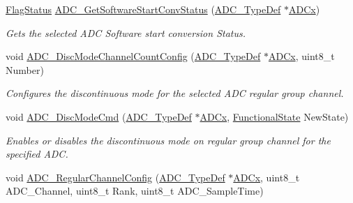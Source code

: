 \begin{DoxyCompactItemize}
\mbox{\hyperlink{group___exported__types_ga89136caac2e14c55151f527ac02daaff}{Flag\+Status}} \mbox{\hyperlink{group___a_d_c___exported___functions_gaf1119583782ecbcec380efcb7eb74883}{A\+D\+C\+\_\+\+Get\+Software\+Start\+Conv\+Status}} (\mbox{\hyperlink{struct_a_d_c___type_def}{A\+D\+C\+\_\+\+Type\+Def}} $\ast$\mbox{\hyperlink{group___s_t_m32_f1_x_x___n_u_c_l_e_o___l_o_w___l_e_v_e_l___exported___constants_gab44c1065d38c298955fc028346984340}{A\+D\+Cx}})
\begin{DoxyCompactList}\small\item\em Gets the selected A\+DC Software start conversion Status. \end{DoxyCompactList}\item 
void \mbox{\hyperlink{group___a_d_c___exported___functions_ga6eb241ba82d67d1371136c9132083937}{A\+D\+C\+\_\+\+Disc\+Mode\+Channel\+Count\+Config}} (\mbox{\hyperlink{struct_a_d_c___type_def}{A\+D\+C\+\_\+\+Type\+Def}} $\ast$\mbox{\hyperlink{group___s_t_m32_f1_x_x___n_u_c_l_e_o___l_o_w___l_e_v_e_l___exported___constants_gab44c1065d38c298955fc028346984340}{A\+D\+Cx}}, uint8\+\_\+t Number)
\begin{DoxyCompactList}\small\item\em Configures the discontinuous mode for the selected A\+DC regular group channel. \end{DoxyCompactList}\item 
void \mbox{\hyperlink{group___a_d_c___exported___functions_ga1909649d10253ce88d986ffbb94a4be6}{A\+D\+C\+\_\+\+Disc\+Mode\+Cmd}} (\mbox{\hyperlink{struct_a_d_c___type_def}{A\+D\+C\+\_\+\+Type\+Def}} $\ast$\mbox{\hyperlink{group___s_t_m32_f1_x_x___n_u_c_l_e_o___l_o_w___l_e_v_e_l___exported___constants_gab44c1065d38c298955fc028346984340}{A\+D\+Cx}}, \mbox{\hyperlink{group___exported__types_gac9a7e9a35d2513ec15c3b537aaa4fba1}{Functional\+State}} New\+State)
\begin{DoxyCompactList}\small\item\em Enables or disables the discontinuous mode on regular group channel for the specified A\+DC. \end{DoxyCompactList}\item 
void \mbox{\hyperlink{group___a_d_c___exported___functions_gac531adb577b648d4bb8881f2ed627d52}{A\+D\+C\+\_\+\+Regular\+Channel\+Config}} (\mbox{\hyperlink{struct_a_d_c___type_def}{A\+D\+C\+\_\+\+Type\+Def}} $\ast$\mbox{\hyperlink{group___s_t_m32_f1_x_x___n_u_c_l_e_o___l_o_w___l_e_v_e_l___exported___constants_gab44c1065d38c298955fc028346984340}{A\+D\+Cx}}, uint8\+\_\+t A\+D\+C\+\_\+\+Channel, uint8\+\_\+t Rank, uint8\+\_\+t A\+D\+C\+\_\+\+Sample\+Time)

\end{DoxyCompactItemize}
